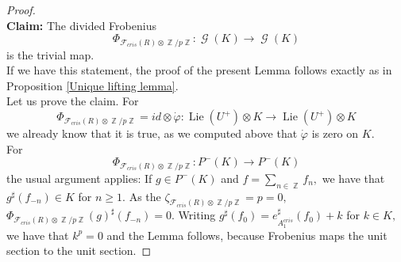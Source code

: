 \documentclass[a4paper,10,5 pt]{amsart}
\theoremstyle{definition}
\DeclareMathOperator{\Lie}{Lie}
\DeclareMathOperator{\G}{\mathcal{G}}
\DeclareMathOperator{\Z}{\mathbb{Z}}
\begin{document}
\begin{proof}
\\
\textbf{Claim:} The divided Frobenius
$$\Phi_{\mathcal{F}_{cris}(R)\otimes \Z/p\Z}\colon \G(K) \rightarrow \G(K)$$ is the trivial map.
\\
If we have this statement, the proof of the present Lemma follows exactly as in Proposition \ref{Unique lifting lemma}.
\\
Let us prove the claim. For 
$$\Phi_{\mathcal{F}_{cris}(R)\otimes \Z/p\Z}=id \otimes \dot{\varphi}\colon \Lie(U^{+})\otimes K \rightarrow \Lie(U^{+}) \otimes K$$ we already know that it is true, as we computed above that $\dot{\varphi}$ is zero on $K.$
\\
For
$$\Phi_{\mathcal{F}_{cris}(R)\otimes \Z/p\Z}\colon P^{-}(K)\rightarrow P^{-}(K)$$
the usual argument applies: If $g\in P^{-}(K)$ and $f=\sum_{n\in \Z} f_{n},$ we have that $g^{\sharp}(f_{-n})\in K$ for $n\geq 1.$ As the $\zeta_{\mathcal{F}_{cris}(R)\otimes \Z/p\Z}=p=0,$ $\Phi_{\mathcal{F}_{cris}(R)\otimes \Z/p\Z}(g)^{\sharp}(f_{-n})=0.$ Writing $g^{\sharp}(f_{0})=e^{\sharp}_{A_{1}^{cris}}(f_{0})+k$ for $k\in K,$ we have that $k^{p}=0$ and the Lemma follows, because Frobenius maps the unit section to the unit section.
\end{proof}
\end{document}
